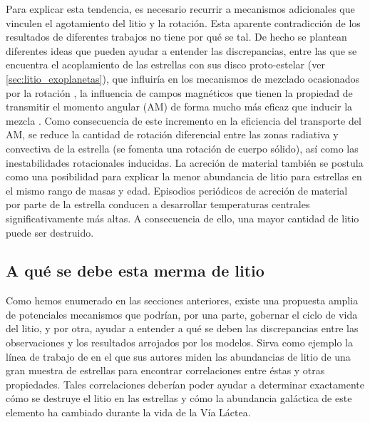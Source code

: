 Para explicar esta tendencia, es necesario recurrir a mecanismos adicionales que vinculen el agotamiento del litio y la rotación. Esta aparente contradicción de los resultados de diferentes trabajos no tiene por qué se tal. De hecho se plantean diferentes ideas que pueden ayudar a entender las discrepancias, entre las que se encuentra el acoplamiento de las estrellas con sus disco proto-estelar (ver \ref{sec:litio_exoplanetas}), que influiría en los mecanismos de mezclado ocasionados por la rotación \citep{Bouvier2008, Eggenberger2012}, la influencia de campos magnéticos \citep{Eggenberger2009} que tienen la propiedad de transmitir el momento angular (AM) de forma mucho más eficaz que inducir la mezcla \citep{Denissenkov2007}. Como consecuencia de este incremento en la eficiencia del transporte del AM, se reduce la cantidad de rotación diferencial entre las zonas radiativa y convectiva de la estrella (se fomenta una rotación de cuerpo sólido), así como las inestabilidades rotacionales inducidas. La acreción de material \citep{Baraffe2010} también se postula como una posibilidad para explicar la menor abundancia de litio para estrellas en el mismo rango de masas y edad. Episodios periódicos de acreción de material por parte de la estrella conducen a desarrollar temperaturas centrales significativamente más altas. A consecuencia de ello, una mayor cantidad de litio puede ser destruido.\par


\subsection{A qué se debe esta merma de litio}
Como hemos enumerado en las secciones anteriores, existe una propuesta amplia de potenciales mecanismos que podrían, por una parte, gobernar el ciclo de vida del litio, y por otra, ayudar a entender a qué se deben las discrepancias entre las observaciones y los resultados arrojados por los modelos. Sirva como ejemplo la línea de trabajo de \cite{Ramirez2012} en el que sus autores miden las abundancias de litio de una gran muestra de estrellas para encontrar correlaciones entre éstas y otras propiedades. Tales correlaciones deberían poder ayudar a determinar exactamente cómo se destruye el litio en las estrellas y cómo la abundancia galáctica de este elemento ha cambiado durante la vida de la Vía Láctea.\par 

